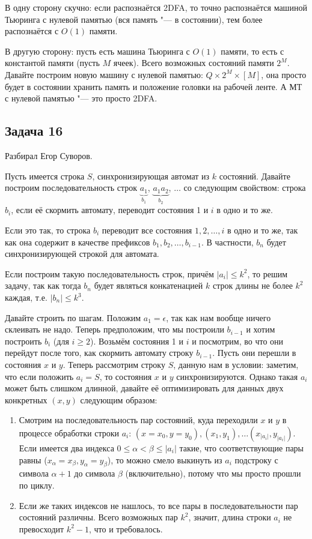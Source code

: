 	В одну сторону скучно: если распознаётся 2DFA, то точно распознаётся машиной Тьюринга с нулевой памятью
	(вся память "--- в состоянии), тем более распознаётся с $O(1)$ памяти.

    В другую сторону: пусть есть машина Тьюринга с $O(1)$ памяти, то есть с константой памяти (пусть $M$ ячеек).
    Всего возможных состояний памяти $2^M$.
    Давайте построим новую машину с нулевой памятью: $Q\times 2^M \times [M]$, она просто будет в состоянии
    хранить память и положение головки на рабочей ленте.
    А МТ с нулевой памятью "--- это просто 2DFA.

\subsection{Задача 16}
	Разбирал Егор Суворов.

	Пусть имеется строка $S$, синхронизирующая автомат из $k$ состояний.
	Давайте построим последовательность строк $\underbrace{a_1}_{b_1}$, $\underbrace{a_1a_2}_{b_2}$, $\dots$
	со следующим свойством: строка $b_i$, если её скормить автомату, переводит состояния 1 и $i$ в одно и то же.
	\begin{Rem}
		Если это так, то строка $b_i$ переводит все состояния $1, 2, \dots, i$ в одно и то же,
		так как она содержит в качестве префиксов $b_1, b_2, \dots, b_{i-1}$.
		В частности, $b_n$ будет синхронизирующей строкой для автомата.
	\end{Rem}
	\begin{Rem}
		Если построим такую последовательность строк, причём $|a_i| \le k^2$, то решим
		задачу, так как тогда $b_n$ будет являться конкатенацией $k$ строк длины не более $k^2$ каждая,
		т.е. $|b_n| \le k^3$.
	\end{Rem}

	Давайте строить по шагам.
	Положим $a_1=\epsilon$, так как нам вообще ничего склеивать не надо.
	Теперь предположим, что мы построили $b_{i-1}$ и хотим построить $b_i$ (для $i \ge 2$).
	Возьмём состояния 1 и $i$ и посмотрим, во что они перейдут после того, как скормить автомату
	строку $b_{i-1}$.
	Пусть они перешли в состояния $x$ и $y$.
	Теперь рассмотрим строку $S$, данную нам в условии: заметим, что если положить $a_i=S$, то
	состояния $x$ и $y$ синхронизируются.
	Однако такая $a_i$ может быть слишком длинной, давайте её оптимизировать для данных двух конкретных $(x, y)$ следующим образом:
	\begin{enumerate}
		\item
			Смотрим на последовательность пар состояний, куда переходили $x$ и $y$
			в процессе обработки строки $a_i$: $(x=x_0, y=y_0), (x_1, y_1), \dots (x_{|a_i|}, y_{|a_i|})$.
			Если имеется два индекса $0 \le \alpha < \beta \le |a_i|$ такие, что
			соответствующие пары равны ($x_\alpha=x_\beta, y_\alpha=y_\beta$), то можно
			смело выкинуть из $a_i$ подстроку с символа $\alpha+1$ до символа $\beta$ (включительно),
			потому что мы просто прошли по циклу.
		\item
			Если же таких индексов не нашлось, то все пары в последовательности пар состояний различны.
			Всего возможных пар $k^2$, значит, длина строки $a_i$ не превосходит $k^2-1$, что и требовалось.
	\end{enumerate}

